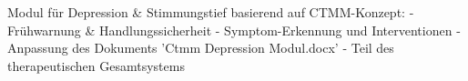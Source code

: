 Modul für Depression & Stimmungstief basierend auf CTMM-Konzept:
- Frühwarnung & Handlungssicherheit
- Symptom-Erkennung und Interventionen
- Anpassung des Dokuments 'Ctmm Depression Modul.docx'
- Teil des therapeutischen Gesamtsystems
